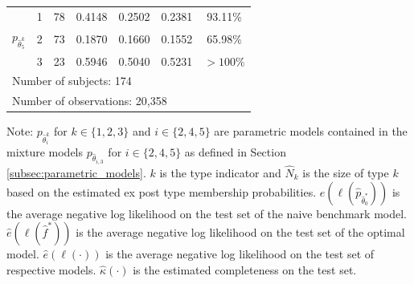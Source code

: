 \documentclass[11pt,a4paper]{article}
\theoremstyle{definition}
\begin{document}
\begin{table}[!ht]
\begin{threeparttable}
\begin{footnotesize}
{\begin{tabular}{@{}lrccccc@{}}
                       & 1    &  78  & 0.4148  &    0.2502      &      0.2381         & 93.11\%                  \\
$p_{\hat{\theta}_{5}^k}$                & 2  &  73   &     0.1870  & 0.1660  &      0.1552         &    65.98\%            \\
                       & 3  & 23   & 0.5946        &    0.5040     &    0.5231   &        $>100\%$           \\ \midrule %
\multicolumn{7}{l}{Number of subjects: 174}      \\
\multicolumn{7}{l}{Number of observations: 20,358}      \\ \bottomrule\bottomrule
\end{tabular}}
\end{footnotesize}
\begin{tablenotes}
      \footnotesize
      \item Note: $p_{\hat{\theta}_{i}^k}$ for $k\in\{1,2,3\}$ and $i\in\{2,4,5\}$ are parametric models contained in the mixture models $p_{\hat{\theta}_{i,3}}$ for $i\in\{2,4,5\}$ as defined in Section \ref{subsec:parametric_models}. $k$ is the type indicator and $\hat{N}_k$ is the size of type $k$ based on the estimated ex post type membership probabilities. $\hat{e}(\ell(\hat{p}_{\hat{\theta}_0^*}))$ is the average negative log likelihood on the test set of the naive benchmark model. $\hat{e}(\ell(\hat{f}^*))$ is the average negative log likelihood on the test set of the optimal model. $\hat{e}(\ell(\cdot))$ is the average negative log likelihood on the test set of respective models. $\hat{\kappa}(\cdot)$ is the estimated completeness on the test set.
    \end{tablenotes}
\end{threeparttable}
\end{table}
\end{document}
